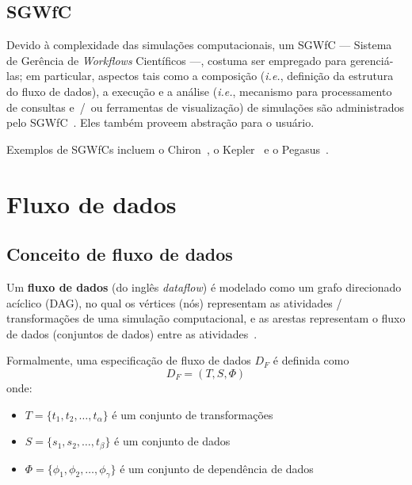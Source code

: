 \subsection{SGWfC}

Devido à complexidade das simulações computacionais, um SGWfC --- Sistema de Gerência de \textit{Workflows} Científicos ---, costuma ser empregado para gerenciá-las; em particular, aspectos tais como a composição (\textit{i.e.}, definição da estrutura do fluxo de dados), a execução e a análise (\textit{i.e.}, mecanismo para processamento de consultas e~/~ou ferramentas de visualização) de simulações são administrados pelo SGWfC~\cite{silva2015propostadoutorado}. Eles também proveem abstração para o usuário.

Exemplos de SGWfCs incluem o Chiron~\cite{ogasawara2013chiron}, o Kepler~\cite{ludascher2006scientific} e o Pegasus~\cite{deelman2005pegasus}.

\section{Fluxo de dados}%
\label{sec:dataflow}

\subsection{Conceito de fluxo de dados} %

Um \textbf{fluxo de dados} (do inglês \textit{dataflow}) é modelado como um grafo direcionado acíclico (DAG), no qual os vértices (nós) representam as atividades / transformações de uma simulação computacional, e as arestas representam o fluxo de dados (conjuntos de dados) entre as atividades~\cite{ogasawara2011algebraic}.

Formalmente, uma especificação de fluxo de dados \( D_F \) é definida como \[ D_F = (T, S, \Phi) \] onde:
\begin{itemize}
    \item \( T = \{t_1, t_2, \ldots, t_{\alpha}\} \) é um conjunto de transformações
    \item \( S = \{s_1, s_2, \ldots, t_{\beta}\} \) é um conjunto de dados
    \item \( \Phi = \{\phi_1, \phi_2, \ldots, \phi_{\gamma}\} \) é um conjunto de dependência de dados
\end{itemize}


